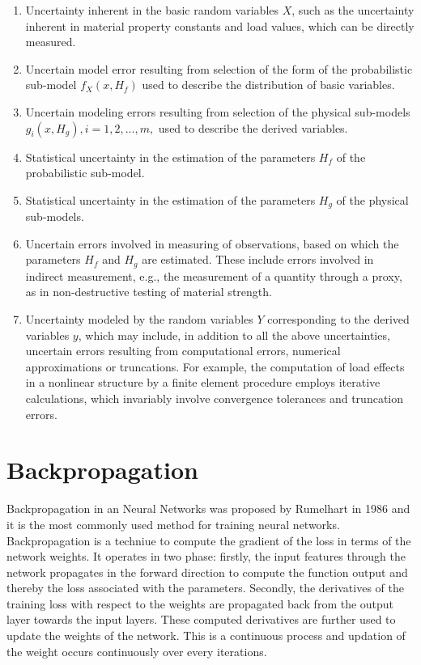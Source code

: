 \begin{enumerate}
    \item Uncertainty inherent in the basic random variables $X$, such as the uncertainty inherent in material property constants and load values, which can be directly measured.
    \item Uncertain model error resulting from selection of the form of the probabilistic sub-model $f_{X}(x,H_{f})$ used to describe the distribution of basic variables.
    \item  Uncertain modeling errors resulting from selection of the physical sub-models $g_{i}(x,H_{g}), i = 1,2,...,m,$ used to describe the derived variables.
    \item  Statistical uncertainty in the estimation of the parameters $H_f$ of the probabilistic sub-model.
    \item  Statistical uncertainty in the estimation of the parameters $H_g$ of the physical sub-models.
    \item  Uncertain errors involved in measuring of observations, based on which the parameters $H_f$ and $H_g$  are estimated. These include errors involved in indirect measurement, e.g., the measurement of a quantity through a proxy, as in non-destructive testing of material strength.
    \item Uncertainty modeled by the random variables $Y$ corresponding to the derived variables $y$, which may include, in addition to all the above uncertainties, uncertain errors resulting from computational errors, numerical approximations or truncations. For example, the computation of load effects in a nonlinear structure by a finite element procedure employs iterative calculations, which invariably involve convergence tolerances and truncation errors.
\end{enumerate} 

\section{Backpropagation}

Backpropagation in an Neural Networks was proposed by Rumelhart \cite{Rumelhart} in 1986 and it is the most commonly used method for training neural networks. Backpropagation is a techniue to compute the gradient of the loss in terms of the network weights. It operates in two phase: firstly, the input features through the network propagates in the forward direction to compute the function output and thereby the loss associated with the parameters. Secondly, the derivatives of the training loss with respect to the weights
are propagated back from the output layer towards the input layers.
These computed derivatives are further used to update the weights of the network. This is a continuous process and updation of the weight occurs continuously over every iterations. 

